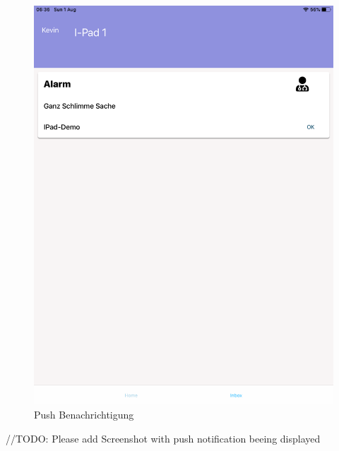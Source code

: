 \begin{figure}[h]
\begin{minipage}[b]{0.4\textwidth}
        \includegraphics[width=\textwidth]{graphics/screenshots/mobileclient/screenshots-inbox}
        \caption{Push Benachrichtigung}
    \end{minipage}
    \label{fig:MobileClient-Screens3}
\end{figure}

//TODO: Please add Screenshot with push notification beeing displayed

\clearpage

